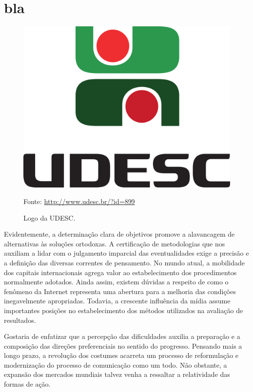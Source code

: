 \documentclass[a4paper,12pt]{udesc}
\begin{document}
\chapter{bla}


\begin{figure}[h!]
\centering
\caption{Logo da UDESC.}

\includegraphics[scale=0.04]{fig/Marca_UDESC_vertical.pdf}


Fonte: \url{http://www.udesc.br/?id=899}


\end{figure}


          Evidentemente, a determinação clara de objetivos promove a alavancagem de alternativas às soluções ortodoxas. A certificação de metodologias que nos auxiliam a lidar com o julgamento imparcial das eventualidades exige a precisão e a definição das diversas correntes de pensamento. No mundo atual, a mobilidade dos capitais internacionais agrega valor ao estabelecimento dos procedimentos normalmente adotados. Ainda assim, existem dúvidas a respeito de como o fenômeno da Internet representa uma abertura para a melhoria das condições inegavelmente apropriadas. Todavia, a crescente influência da mídia assume importantes posições no estabelecimento dos métodos utilizados na avaliação de resultados. 

          Gostaria de enfatizar que a percepção das dificuldades auxilia a preparação e a composição das direções preferenciais no sentido do progresso. Pensando mais a longo prazo, a revolução dos costumes acarreta um processo de reformulação e modernização do processo de comunicação como um todo. Não obstante, a expansão dos mercados mundiais talvez venha a ressaltar a relatividade das formas de ação. 
\end{document}
